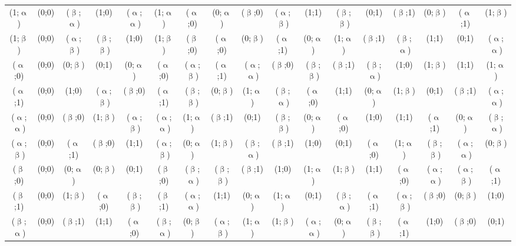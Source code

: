 {\begin{minipage}[c]{0.9\textheight}
\begin{center}
\begin{tabularx}{1.06\linewidth}{c|cccccccccccccccc}
 (1;$\upalpha$) & (0;0) & ($\upbeta$;$\upalpha$) & (1;0) & ($\upalpha$;$\upalpha$) & (1;$\upalpha$) & ($\upalpha$;0) & (0;$\upalpha$) & ($\upbeta$;0) & ($\upalpha$;$\upbeta$) & (1;1) & ($\upbeta$;$\upbeta$) & (0;1) & ($\upbeta$;1) & (0;$\upbeta$) & ($\upalpha$;1) & (1;$\upbeta$) \\
 (1;$\upbeta$) & (0;0) & ($\upalpha$;$\upbeta$) & ($\upbeta$;$\upbeta$) & (1;0) & (1;$\upbeta$) & ($\upbeta$;0) & ($\upalpha$;0) & (0;$\upbeta$) & ($\upalpha$;1) & (0;$\upalpha$) & (1;$\upalpha$) & ($\upbeta$;1) & ($\upbeta$;$\upalpha$) & (1;1) & (0;1) & ($\upalpha$;$\upalpha$) \\
 ($\upalpha$;0) & (0;0) & (0;$\upbeta$) & (0;1) & (0;$\upalpha$) & ($\upalpha$;0) & ($\upalpha$;$\upbeta$) & ($\upalpha$;1) & ($\upalpha$;$\upalpha$) & ($\upbeta$;0) & ($\upbeta$;$\upbeta$) & ($\upbeta$;1) & ($\upbeta$;$\upalpha$) & (1;0) & (1;$\upbeta$) & (1;1) & (1;$\upalpha$) \\
 ($\upalpha$;1) & (0;0) & (1;0) & ($\upalpha$;$\upbeta$) & ($\upbeta$;0) & ($\upalpha$;1) & ($\upbeta$;$\upbeta$) & (0;$\upbeta$) & (1;$\upalpha$) & ($\upbeta$;$\upalpha$) & ($\upalpha$;0) & (1;1) & (0;$\upalpha$) & (1;$\upbeta$) & (0;1) & ($\upbeta$;1) & ($\upalpha$;$\upalpha$) \\
 ($\upalpha$;$\upalpha$) & (0;0) & ($\upbeta$;0) & (1;$\upbeta$) & ($\upalpha$;$\upbeta$) & ($\upalpha$;$\upalpha$) & (1;$\upalpha$) & ($\upbeta$;1) & (0;1) & ($\upbeta$;$\upbeta$) & (0;$\upalpha$) & ($\upalpha$;0) & (1;0) & (1;1) & ($\upalpha$;1) & (0;$\upalpha$) & ($\upbeta$;$\upalpha$) \\
 ($\upalpha$;$\upbeta$) & (0;0) & ($\upalpha$;1) & ($\upbeta$;0) & (1;1) & ($\upalpha$;$\upbeta$) & (0;$\upalpha$) & (1;$\upbeta$) & ($\upbeta$;$\upalpha$) & ($\upbeta$;1) & (1;0) & (0;1) & ($\upalpha$;0) & (1;$\upalpha$) & ($\upbeta$;$\upbeta$) & ($\upalpha$;$\upalpha$) & (0;$\upbeta$) \\
 ($\upbeta$;0) & (0;0) & (0;$\upalpha$) & (0;$\upbeta$) & (0;1) & ($\upbeta$;0) & ($\upbeta$;$\upalpha$) & ($\upbeta$;$\upbeta$) & ($\upbeta$;1) & (1;0) & (1;$\upalpha$) & (1;$\upbeta$) & (1;1) & ($\upalpha$;0) & ($\upalpha$;$\upalpha$) & ($\upalpha$;$\upbeta$) & ($\upalpha$;1) \\
 ($\upbeta$;1) & (0;0) & (1;$\upbeta$) & ($\upalpha$;0) & ($\upbeta$;$\upbeta$) & ($\upbeta$;1) & ($\upalpha$;$\upalpha$) & (1;1) & (0;$\upalpha$) & (1;$\upalpha$) & (0;1) & ($\upbeta$;$\upalpha$) & ($\upalpha$;1) & ($\upalpha$;$\upbeta$) & ($\upbeta$;0) & (0;$\upbeta$) & (1;0) \\
 ($\upbeta$;$\upalpha$) & (0;0) & ($\upbeta$;1) & (1;1) & ($\upalpha$;0) & ($\upbeta$;$\upalpha$) & (0;$\upbeta$) & ($\upalpha$;$\upbeta$) & (1;$\upalpha$) & (1;$\upbeta$) & ($\upalpha$;$\upalpha$) & (0;$\upalpha$) & ($\upbeta$;$\upbeta$) & ($\upalpha$;1) & (1;0) & ($\upbeta$;0) & (0;1) \\

\end{tabularx}
\end{center}
\end{minipage}}
